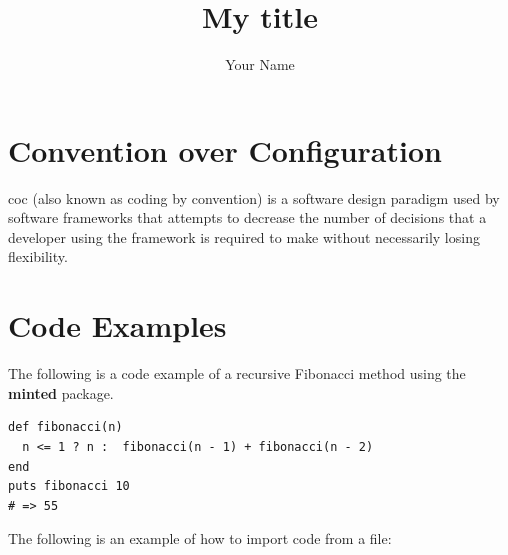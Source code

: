 \documentclass{article}
\title{My title}
\author{Your Name}
\begin{document}
\maketitle
\printacronyms{}

\section{Convention over Configuration}

\acrfull{coc} (also known as coding by convention) is a software design paradigm used by software frameworks that attempts to decrease the number of decisions that a developer using the framework is required to make without necessarily losing flexibility.

\section{Code Examples}

The following is a code example of a recursive Fibonacci method using the \textbf{minted} package.

\begin{verbatim}
def fibonacci(n)
  n <= 1 ? n :  fibonacci(n - 1) + fibonacci(n - 2)
end
puts fibonacci 10
# => 55
\end{verbatim}

The following is an example of how to import code from a file:

\inputminted[tabsize=2]{ruby}{../assets/code/example.rb}

\blindmathpaper{}

\end{document}
